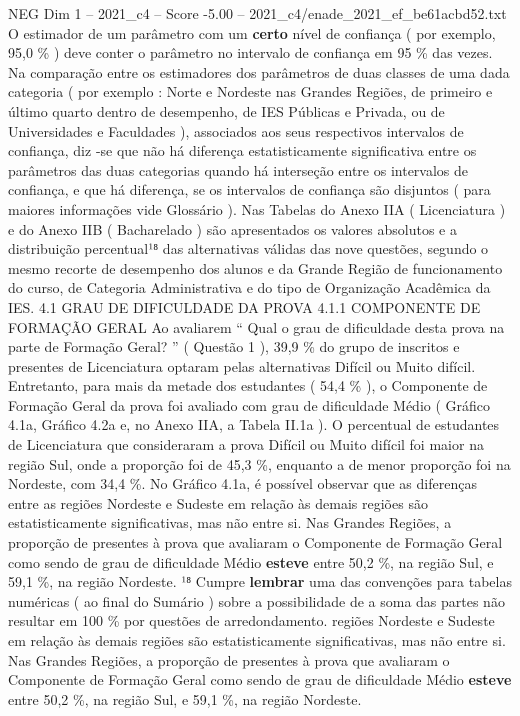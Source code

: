 \begin{textsample}{NEG Dim 1 – 2021\_c4 – Score -5.00 – 2021\_c4/enade\_2021\_ef\_be61acbd52.txt}
O estimador de um parâmetro com um \textbf{certo} nível de confiança ( por exemplo, 95,0 \% ) deve conter o parâmetro no intervalo de confiança em 95 \% das vezes.
Na comparação entre os estimadores dos parâmetros de duas classes de uma dada categoria ( por exemplo : Norte e Nordeste nas Grandes Regiões, de primeiro e último quarto dentro de desempenho, de IES Públicas e Privada, ou de Universidades e Faculdades ), associados aos seus respectivos intervalos de confiança, diz -se que não há diferença estatisticamente significativa entre os parâmetros das duas categorias quando há interseção entre os intervalos de confiança, e que há diferença, se os intervalos de confiança são disjuntos ( para maiores informações vide Glossário ).
Nas Tabelas do Anexo IIA ( Licenciatura ) e do Anexo IIB ( Bacharelado ) são apresentados os valores absolutos e a distribuição percentual¹⁸ das alternativas válidas das nove questões, segundo o mesmo recorte de desempenho dos alunos e da Grande Região de funcionamento do curso, de Categoria Administrativa e do tipo de Organização Acadêmica da IES. 4.1 GRAU DE DIFICULDADE DA PROVA 4.1.1 COMPONENTE DE FORMAÇÃO GERAL Ao avaliarem “ Qual o grau de dificuldade desta prova na parte de Formação Geral? ” ( Questão 1 ), 39,9 \% do grupo de inscritos e presentes de Licenciatura optaram pelas alternativas Difícil ou Muito difícil.
Entretanto, para mais da metade dos estudantes ( 54,4 \% ), o Componente de Formação Geral da prova foi avaliado com grau de dificuldade Médio ( Gráfico 4.1a, Gráfico 4.2a e, no Anexo IIA, a Tabela II.1a ).
O percentual de estudantes de Licenciatura que consideraram a prova Difícil ou Muito difícil foi maior na região Sul, onde a proporção foi de 45,3 \%, enquanto a de menor proporção foi na Nordeste, com 34,4 \%.
No Gráfico 4.1a, é possível observar que as diferenças entre as regiões Nordeste e Sudeste em relação às demais regiões são estatisticamente significativas, mas não entre si.
Nas Grandes Regiões, a proporção de presentes à prova que avaliaram o Componente de Formação Geral como sendo de grau de dificuldade Médio \textbf{esteve} entre 50,2 \%, na região Sul, e 59,1 \%, na região Nordeste. ¹⁸ Cumpre \textbf{lembrar} uma das convenções para tabelas numéricas ( ao final do Sumário ) sobre a possibilidade de a soma das partes não resultar em 100 \% por questões de arredondamento. regiões Nordeste e Sudeste em relação às demais regiões são estatisticamente significativas, mas não entre si.
Nas Grandes Regiões, a proporção de presentes à prova que avaliaram o Componente de Formação Geral como sendo de grau de dificuldade Médio \textbf{esteve} entre 50,2 \%, na região Sul, e 59,1 \%, na região Nordeste.

\end{textsample}
